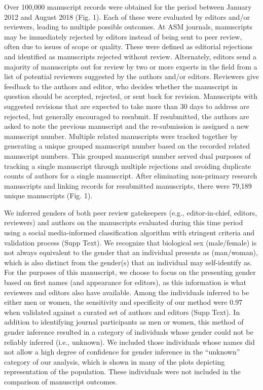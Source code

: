 \documentclass[11pt,]{article}
\begin{document}
Over 100,000 manuscript records were obtained for the period between
January 2012 and August 2018 (Fig. 1). Each of these were evaluated by
editors and/or reviewers, leading to multiple possible outcomes. At ASM
journals, manuscripts may be immediately rejected by editors instead of
being sent to peer review, often due to issues of scope or quality.
These were defined as editorial rejections and identified as manuscripts
rejected without review. Alternately, editors send a majority of
manuscripts out for review by two or more experts in the field from a
list of potential reviewers suggested by the authors and/or editors.
Reviewers give feedback to the authors and editor, who decides whether
the manuscript in question should be accepted, rejected, or sent back
for revision. Manuscripts with suggested revisions that are expected to
take more than 30 days to address are rejected, but generally encouraged
to resubmit. If resubmitted, the authors are asked to note the previous
manuscript and the re-submission is assigned a new manuscript number.
Multiple related manuscripts were tracked together by generating a
unique grouped manuscript number based on the recorded related
manuscript numbers. This grouped manuscript number served dual purposes
of tracking a single manuscript through multiple rejections and avoiding
duplicate counts of authors for a single manuscript. After eliminating
non-primary research manuscripts and linking records for resubmitted
manuscripts, there were 79,189 unique manuscripts (Fig. 1).

We inferred genders of both peer review gatekeepers (e.g.,
editor-in-chief, editors, reviewers) and authors on the manuscripts
evaluated during this time period using a social media-informed
classification algorithm with stringent criteria and validation process
(Supp Text). We recognize that biological sex (male/female) is not
always equivalent to the gender that an individual presents as
(man/woman), which is also distinct from the gender(s) that an
individual may self-identify as. For the purposes of this manuscript, we
choose to focus on the presenting gender based on first names (and
appearance for editors), as this information is what reviewers and
editors also have available. Among the individuals inferred to be either
men or women, the sensitivity and specificity of our method were 0.97
when validated against a curated set of authors and editors (Supp Text).
In addition to identifying journal participants as men or women, this
method of gender inference resulted in a category of individuals whose
gender could not be reliably inferred (i.e., unknown). We included those
individuals whose names did not allow a high degree of confidence for
gender inference in the ``unknown'' category of our analysis, which is
shown in many of the plots depicting representation of the population.
These individuals were not included in the comparison of manuscript
outcomes.
\end{document}
